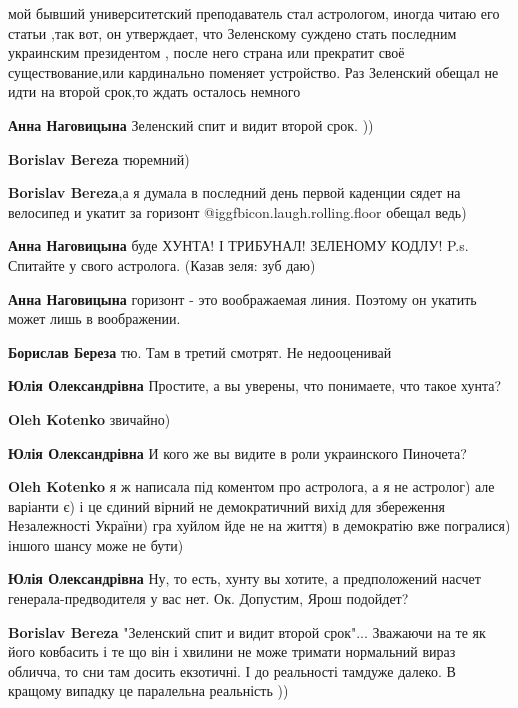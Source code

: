 \begin{itemize}

мой бывший университетский преподаватель стал астрологом, иногда читаю его
статьи ,так вот, он утверждает, что Зеленскому суждено стать последним
украинским президентом , после него страна или прекратит своё существование,или
кардинально поменяет устройство. Раз Зеленский обещал не идти на второй срок,то
ждать осталось немного

\begin{itemize} %
\textbf{Анна Наговицына} Зеленский спит и видит второй срок. ))

\textbf{Borislav Bereza} тюремний)

\textbf{Borislav Bereza},а я думала в последний день первой каденции сядет на велосипед и укатит за горизонт  @igg{fbicon.laugh.rolling.floor}  обещал ведь)

\textbf{Анна Наговицына} буде ХУНТА! І ТРИБУНАЛ! ЗЕЛЕНОМУ КОДЛУ!
P.s. Спитайте у свого астролога. (Казав зеля: зуб даю)

\textbf{Анна Наговицына} горизонт - это воображаемая линия. Поэтому он укатить может лишь в воображении.


\textbf{Борислав Береза} тю. Там в третий смотрят. Не недооценивай

\textbf{Юлія Олександрівна} Простите, а вы уверены, что понимаете, что такое хунта?

\textbf{Oleh Kotenko} звичайно)

\textbf{Юлія Олександрівна} И кого же вы видите в роли украинского Пиночета?

\textbf{Oleh Kotenko} я ж написала під коментом про астролога, а я не астролог) але варіанти є) і це єдиний вірний не демократичний вихід для збереження Незалежності України) гра хуйлом йде не на життя) в демократію вже погралися) іншого шансу може не бути)

\textbf{Юлія Олександрівна} Ну, то есть, хунту вы хотите, а предположений насчет генерала-предводителя у вас нет. Ок. Допустим, Ярош подойдет?

\textbf{Borislav Bereza} "Зеленский спит и видит второй срок"... Зважаючи на те як його ковбасить і те що він і хвилини не може тримати нормальний вираз обличча, то сни там досить екзотичні. І до реальності тамдуже далеко. В кращому випадку це паралельна реальність ))


\end{itemize}
\end{itemize}
